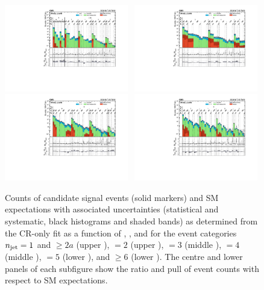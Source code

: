 \begin{figure}[!p]
  \centering
  \caption{Counts of candidate signal events (solid markers) and SM
    expectations with associated uncertainties (statistical and
    systematic, black histograms and shaded bands) as determined from
    the CR-only fit as a function of \nb, \scalht, and \mht for the
    event categories $n_{\text{jet}} = 1$ and ${\geq}2a$ (upper \cmsLeft), $=2$
    (upper \cmsRight), $=3$ (middle \cmsLeft), $=4$ (middle
    \cmsRight), $=5$ (lower \cmsLeft), and ${\geq}6$ (lower
    \cmsRight). The centre and lower panels of each subfigure show the
    ratio and pull of event counts with respect to SM expectations.}
  \includegraphics[width=0.48\textwidth, trim=10 0 60 10, clip=true]{Figures/1jet_cr-only.pdf}~ 
  \includegraphics[width=0.48\textwidth, trim=10 0 60 10, clip=true]{Figures/2jet_cr-only.pdf}\\
  \includegraphics[width=0.48\textwidth, trim=10 0 60 10, clip=true]{Figures/3jet_cr-only.pdf}~
  \includegraphics[width=0.48\textwidth, trim=10 0 60 10, clip=true]{Figures/4jet_cr-only.pdf}\\

\end{figure}

